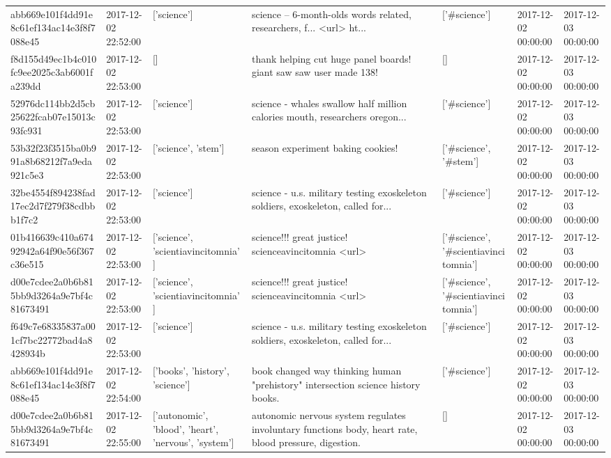 \begin{tabular}{lllllll}
abb669e101f4dd91e8c61ef134ac14e3f8f7088e45 & 2017-12-02 22:52:00 & ['science'] & science -- 6-month-olds words related, researchers, f... <url> ht... & ['#science'] & 2017-12-02 00:00:00 & 2017-12-03 00:00:00 \\
f8d155d49ec1b4c010fc9ee2025c3ab6001fa239dd & 2017-12-02 22:53:00 & [] & thank helping cut huge panel boards! giant saw saw user made 138! & [] & 2017-12-02 00:00:00 & 2017-12-03 00:00:00 \\
52976dc114bb2d5cb25622fcab07e15013c93fc931 & 2017-12-02 22:53:00 & ['science'] & science - whales swallow half million calories mouth, researchers oregon... & ['#science'] & 2017-12-02 00:00:00 & 2017-12-03 00:00:00 \\
53b32f23f3515ba0b991a8b68212f7a9eda921c5e3 & 2017-12-02 22:53:00 & ['science', 'stem'] & season experiment baking cookies! & ['#science', '#stem'] & 2017-12-02 00:00:00 & 2017-12-03 00:00:00 \\
32be4554f894238fad17ec2d7f279f38cdbbb1f7c2 & 2017-12-02 22:53:00 & ['science'] & science - u.s. military testing exoskeleton soldiers, exoskeleton, called for... & ['#science'] & 2017-12-02 00:00:00 & 2017-12-03 00:00:00 \\
01b416639c410a67492942a64f90e56f367c36e515 & 2017-12-02 22:53:00 & ['science', 'scientiavincitomnia'] & science!!! great justice! scienceavincitomnia <url> & ['#science', '#scientiavincitomnia'] & 2017-12-02 00:00:00 & 2017-12-03 00:00:00 \\
d00e7cdee2a0b6b815bb9d3264a9e7bf4c81673491 & 2017-12-02 22:53:00 & ['science', 'scientiavincitomnia'] & science!!! great justice! scienceavincitomnia <url> & ['#science', '#scientiavincitomnia'] & 2017-12-02 00:00:00 & 2017-12-03 00:00:00 \\
f649c7e68335837a001cf7bc22772bad4a8428934b & 2017-12-02 22:53:00 & ['science'] & science - u.s. military testing exoskeleton soldiers, exoskeleton, called for... & ['#science'] & 2017-12-02 00:00:00 & 2017-12-03 00:00:00 \\
abb669e101f4dd91e8c61ef134ac14e3f8f7088e45 & 2017-12-02 22:54:00 & ['books', 'history', 'science'] & book changed way thinking human "prehistory" intersection science history books. & ['#science'] & 2017-12-02 00:00:00 & 2017-12-03 00:00:00 \\
d00e7cdee2a0b6b815bb9d3264a9e7bf4c81673491 & 2017-12-02 22:55:00 & ['autonomic', 'blood', 'heart', 'nervous', 'system'] & autonomic nervous system regulates involuntary functions body, heart rate, blood pressure, digestion. & [] & 2017-12-02 00:00:00 & 2017-12-03 00:00:00 \\

\end{tabular}
